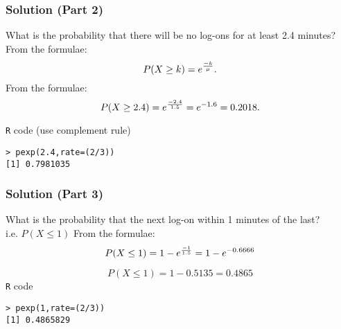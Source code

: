 \documentclass[a4]{beamer}
\begin{document}
\begin{frame}[fragile]
\frametitle{Solution (Part 2) }
\Large

What is the probability that there will be no log-ons for at least 2.4 minutes?\\
\bigskip
From the formulae:
\[
P( X \geq k) = e^{{-k \over \mu}} .
\]
From the formulae:
\[
P( X \geq 2.4) = e^{{-2.4 \over 1.5}} = e^{-1.6} = 0.2018.
\]

\texttt{R} code (use complement rule)
\begin{verbatim}
> pexp(2.4,rate=(2/3))
[1] 0.7981035
\end{verbatim}
\end{frame}

\begin{frame}[fragile]
\frametitle{Solution (Part 3) }
\Large

What is the probability that the next log-on within 1 minutes of the last?\\
i.e. $P(X \leq 1)$
\bigskip
From the formulae:
\[
P( X \leq 1) = 1 - e^{{-1 \over 1.5}} = 1 -  e^{-0.6666}
\]

\[
P( X \leq 1) = 1 -  0.5135  = 0.4865
\]
\texttt{R} code 
\begin{verbatim}
> pexp(1,rate=(2/3))
[1] 0.4865829
\end{verbatim}
\end{frame}

\end{document}
